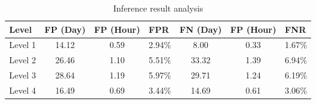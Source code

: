 \begin{table}[h]
\centering
\small
\caption{Inference result analysis}
\label{tab:fpfn}
\begin{tabular}{|l|c|c|c|c|c|c|}
\hline
\textbf{Level} & \multicolumn{1}{l|}{\textbf{FP (Day)}} & \multicolumn{1}{l|}{\textbf{FP (Hour)}} & \multicolumn{1}{l|}{\textbf{FPR}} & \multicolumn{1}{l|}{\textbf{FN (Day)}} & \multicolumn{1}{l|}{\textbf{FP (Hour)}} & \multicolumn{1}{l|}{\textbf{FNR}} \\ \hline
Level 1        & 14.12                                                  & 0.59                                                    & 2.94\%                                            & 8.00                                                   & 0.33                                                    & 1.67\%                                            \\ \hline
Level 2        & 26.46                                                  & 1.10                                                    & 5.51\%                                            & 33.32                                                  & 1.39                                                    & 6.94\%                                            \\ \hline
Level 3        & 28.64                                                  & 1.19                                                    & 5.97\%                                            & 29.71                                                  & 1.24                                                    & 6.19\%                                            \\ \hline
Level 4        & 16.49                                                  & 0.69                                                    & 3.44\%                                            & 14.69                                                  & 0.61                                                    & 3.06\%                                            \\ \hline
\end{tabular}
\end{table}

